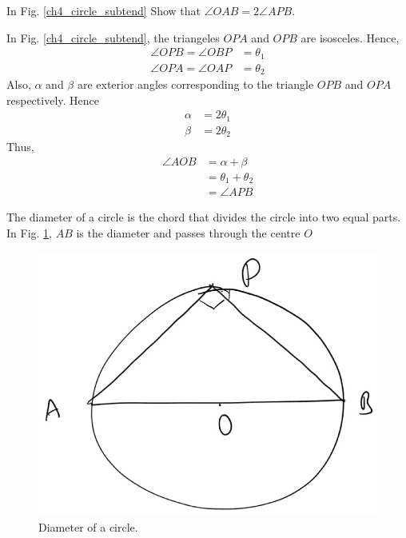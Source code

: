 %
\begin{problem}
	\label{ch4_prob_circle_subtend}
	In Fig. \ref{ch4_circle_subtend}  Show that $\angle OAB = 2\angle APB $.
\end{problem}
\proof In Fig. \ref{ch4_circle_subtend}, the triangeles $OPA$ and $OPB$ are isosceles. Hence,
%
\begin{align}
\angle OPB = \angle OBP &= \theta_1 \\
\angle OPA = \angle OAP &= \theta_2
\end{align}
%
Also, $\alpha$ and $\beta$ are exterior angles corresponding to the triangle $OPB$ and $OPA$ respectively. Hence
%
\begin{align}
\alpha &= 2\theta_1 \\
\beta &= 2\theta_2
\end{align}
%
Thus,
%
\begin{align}
\angle AOB &= \alpha + \beta \\
&= \theta_1 + \theta_2 \\
&= \angle APB
\end{align}
%
\begin{definition}
	The diameter of a circle is the chord that divides the circle into two equal parts. In Fig. \ref{ch4_circle_dia}, $AB$ is the diameter and passes through the centre $O$
\end{definition}
%
\begin{figure}[!h]
	\begin{center}
		
		\includegraphics[width=\columnwidth]{./figs/ch4_circle_dia}
		\vspace*{-10cm}
	\end{center}
	\caption{Diameter of a circle.}
	\label{ch4_circle_dia}	
\end{figure}
